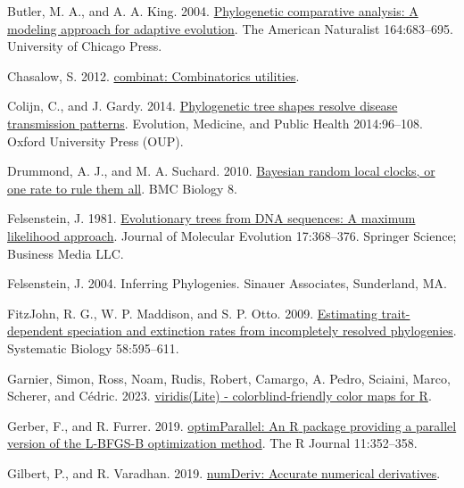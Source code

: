 \documentclass[fleqn,10pt,lineno]{wlpeerj} %
\newlength{\cslhangindent}
\newenvironment{CSLReferences}[2] %
 {\begin{list}{}{%
  \setlength{\itemindent}{0pt}
  \setlength{\leftmargin}{0pt}
  \setlength{\parsep}{0pt}
  \ifodd #1
   \setlength{\leftmargin}{\cslhangindent}
   \setlength{\itemindent}{-1\cslhangindent}
  \fi
  \setlength{\itemsep}{#2\baselineskip}}}
 {\end{list}}
\begin{document}
\begin{CSLReferences}{1}{0}
Butler, M. A., and A. A. King. 2004. \href{https://doi.org/10.1086/426002}{Phylogenetic comparative analysis: A modeling approach for adaptive evolution}. The American Naturalist 164:683--695. University of Chicago Press.

Chasalow, S. 2012. \href{https://CRAN.R-project.org/package=combinat}{{combinat}: Combinatorics utilities}.

Colijn, C., and J. Gardy. 2014. \href{https://doi.org/10.1093/emph/eou018}{Phylogenetic tree shapes resolve disease transmission patterns}. Evolution, Medicine, and Public Health 2014:96--108. Oxford University Press (OUP).

Drummond, A. J., and M. A. Suchard. 2010. \href{https://doi.org/10.1186/1741-7007-8-114}{Bayesian random local clocks, or one rate to rule them all}. {BMC} Biology 8.

Felsenstein, J. 1981. \href{https://doi.org/10.1007/bf01734359}{Evolutionary trees from DNA sequences: A maximum likelihood approach}. Journal of Molecular Evolution 17:368--376. Springer Science; Business Media LLC.

Felsenstein, J. 2004. {Inferring Phylogenies}. {Sinauer Associates}, Sunderland, MA.

FitzJohn, R. G., W. P. Maddison, and S. P. Otto. 2009. \href{https://doi.org/10.1093/sysbio/syp067}{Estimating trait-dependent speciation and extinction rates from incompletely resolved phylogenies}. Systematic Biology 58:595--611.

Garnier, Simon, Ross, Noam, Rudis, Robert, Camargo, A. Pedro, Sciaini, Marco, Scherer, and Cédric. 2023. \href{https://doi.org/10.5281/zenodo.4678327}{{viridis(Lite)} - colorblind-friendly color maps for {R}}.

Gerber, F., and R. Furrer. 2019. \href{https://doi.org/10.32614/RJ-2019-030}{optimParallel: An {R} package providing a parallel version of the {L}-BFGS-{B} optimization method}. The R Journal 11:352--358.

Gilbert, P., and R. Varadhan. 2019. \href{https://CRAN.R-project.org/package=numDeriv}{numDeriv: Accurate numerical derivatives}.


\end{CSLReferences}
\end{document}
